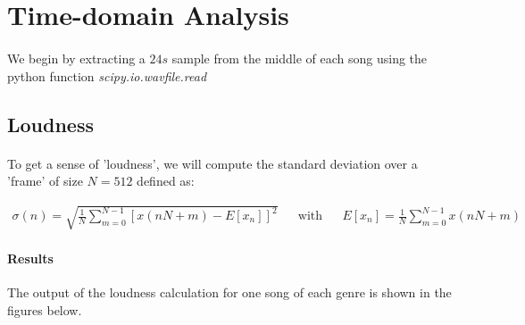 \documentclass[11pt,a4paper]{article}
\begin{document}
\section{Time-domain Analysis}
\paragraph*{} We begin by extracting a $24s$ sample from the middle of each song using the python function \textit{scipy.io.wavfile.read}
\subsection{Loudness}
\paragraph{} To get a sense of 'loudness', we will compute the standard deviation over a 'frame' of size $N=512$ defined as:

\begin{align}
\sigma(n)=\sqrt{\frac{1}{N}\sum_{m=0}^{N-1} [x(nN+m)-E[x_n]]^2} && \text{with} && E[x_n]=\frac{1}{N}\sum_{m=0}^{N-1} x(nN+m)
\end{align}

\paragraph{Results} The output of the loudness calculation for one song of each genre is shown in the figures below. 
\end{document}
